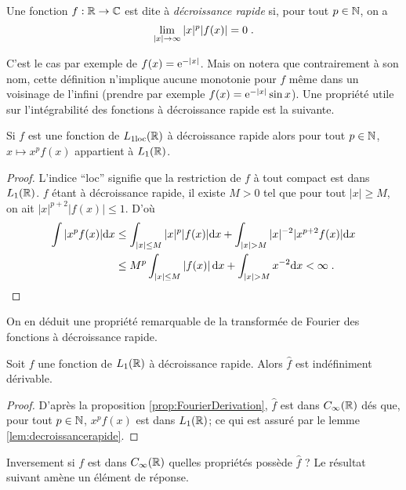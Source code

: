 \begin{definition}
Une fonction $f : \mathbb{R} \to \mathbb{C}$ est dite {\`a} \emph{d{\'e}croissance rapide} si, pour tout $p \in \mathbb{N}$,
on a
$$
\lim_{|x| \to \infty} |x|^p |f (x)| = 0 \;.
$$
\end{definition}
C'est le cas par exemple de $f (x) = \mathrm{e}^{-|x|}$.
Mais on notera que contrairement {\`a} son nom, cette d{\'e}finition n'implique aucune monotonie pour
$f$ m{\^e}me dans un voisinage de l'infini (prendre par exemple $f (x) = \mathrm{e}^{-|x|} \sin x$).
Une propri{\'e}t{\'e} utile sur l'int{\'e}grabilit{\'e} des fonctions {\`a} d{\'e}croissance rapide est la suivante.
\begin{lemma}
\label{lem:decroissancerapide}
 Si $f$ est une fonction de $L_{1\mathrm{loc}}(\mathbb{R})$ {\`a} d{\'e}croissance rapide alors pour tout
 $p \in \mathbb{N}$, $x \mapsto x^p f (x)$ appartient {\`a} $L_1(\mathbb{R})$.
\end{lemma}
\begin{proof}
L'indice ``loc'' signifie que la restriction de $f$ {\`a} tout compact est dans $L_1(\mathbb{R})$.
 $f$ {\'e}tant {\`a} d{\'e}croissance rapide, il existe $M > 0$ tel que pour tout $|x| \geq  M$,
on ait $|x|^{p+2} |f(x)| \leq  1$. D'o{\`u}
\begin{align*}
\int |x^p f(x)| \mathrm{d} x &\leq \int_{|x| \leq M}  |x|^p |f(x)| \mathrm{d} x+ \int_{|x| > M} |x|^{-2} |x^{p+2}  f(x)| \mathrm{d} x \\
&\leq  M^p \int_{|x| \leq M} |f(x)|\, \mathrm{d} x +  \int_{|x| > M}   x^{-2} \mathrm{d} x < \infty\;.
\end{align*}
\end{proof}
On en d{\'e}duit une propri{\'e}t{\'e} remarquable de la transform{\'e}e de Fourier des fonctions {\`a} d{\'e}croissance rapide.
\begin{proposition}
\label{prop:1913}
Soit $f$ une fonction de $L_1(\mathbb{R})$ {\`a} d{\'e}croissance rapide. Alors $\hat{f}$ est ind{\'e}finiment d{\'e}rivable.
\end{proposition}
\begin{proof}
D'apr{\`e}s la proposition \ref{prop:FourierDerivation}, $\hat{f}$ est dans $C_\infty(\mathbb{R})$ d{\'e}s que, pour tout $p \in  \mathbb{N}$,
$x^p f (x)$ est dans $L_1(\mathbb{R})$; ce qui est assur{\'e} par  le lemme \ref{lem:decroissancerapide}.
\end{proof}
Inversement si $f$ est dans $C_\infty(\mathbb{R})$ quelles propri{\'e}t{\'e}s poss{\`e}de $\hat{f}$ ? Le r{\'e}sultat suivant am{\`e}ne un {\'e}l{\'e}ment de r{\'e}ponse.

